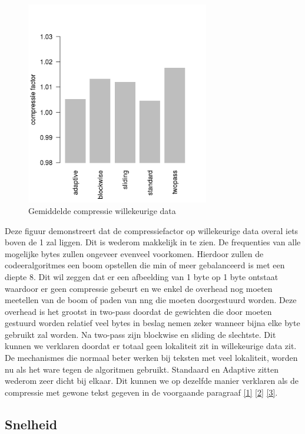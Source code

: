 \documentclass[twoside,twocolumn]{article}
\begin{document}
            \begin{figure}[H]
                \begin{center}
                     \includegraphics[width=8cm]{images/compressie-random.png}    
                \end{center}
                \caption{Gemiddelde compressie willekeurige data}
                \label{compressie}
            \end{figure}
            Deze figuur demonstreert dat de compressiefactor op willekeurige data overal iets boven de 1 zal liggen. Dit is wederom makkelijk in te zien. De frequenties van alle mogelijke bytes zullen ongeveer evenveel voorkomen. Hierdoor zullen de codeeralgoritmes een boom opstellen die min of meer gebalanceerd is met een diepte 8. Dit wil zeggen dat er een afbeelding van 1 byte op 1 byte ontstaat waardoor er geen compressie gebeurt en we enkel de overhead nog moeten meetellen van de boom of paden van nng die moeten doorgestuurd worden. Deze overhead is het grootst in two-pass doordat de gewichten die door moeten gestuurd worden relatief veel bytes in beslag nemen zeker wanneer bijna elke byte gebruikt zal worden. Na two-pass zijn blockwise en sliding de slechtste. Dit kunnen we verklaren doordat er totaal geen lokaliteit zit in willekeurige data zit. De mechanismes die normaal beter werken bij teksten met veel lokaliteit, worden nu als het ware tegen de algoritmen gebruikt. Standaard en Adaptive zitten wederom zeer dicht bij elkaar. Dit kunnen we op dezelfde manier verklaren als de compressie met gewone tekst gegeven in de voorgaande paragraaf \ref{1} \ref{2} \ref{3}.  
    
            
    \subsection{Snelheid}
\end{document}
